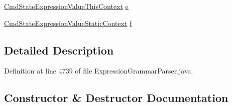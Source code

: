 \begin{DoxyCompactItemize}
\item 
\hyperlink{classgov_1_1nasa_1_1jpf_1_1inspector_1_1server_1_1expression_1_1parser_1_1_expression_grammar_pa5c670e8752735864512a29116a6ade67}{Cmd\+State\+Expression\+Value\+This\+Context} \hyperlink{classgov_1_1nasa_1_1jpf_1_1inspector_1_1server_1_1expression_1_1parser_1_1_expression_grammar_pa672388ef0800b4a3d173ab7548f6b406_af717f73789f5c7985c6af30516f51b9c}{e}
\item 
\hyperlink{classgov_1_1nasa_1_1jpf_1_1inspector_1_1server_1_1expression_1_1parser_1_1_expression_grammar_pa08e6165e66cacb4d3382a343315ee767}{Cmd\+State\+Expression\+Value\+Static\+Context} \hyperlink{classgov_1_1nasa_1_1jpf_1_1inspector_1_1server_1_1expression_1_1parser_1_1_expression_grammar_pa672388ef0800b4a3d173ab7548f6b406_a189dcfe39c0696c6f56a4f10fb23c94c}{f}
\end{DoxyCompactItemize}


\subsection{Detailed Description}


Definition at line 4739 of file Expression\+Grammar\+Parser.\+java.



\subsection{Constructor \& Destructor Documentation}

